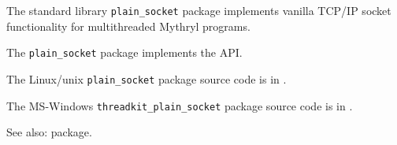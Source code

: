 
The standard library {\tt plain\_socket} package implements vanilla {\sc TCP/IP} socket functionality for multithreaded Mythryl programs.

The {\tt plain\_socket} package implements the  API.

The Linux/unix {\tt plain\_socket} package source code is in .

The {\sc MS-Windows} {\tt threadkit\_plain\_socket} package source code is in .

See also:  package.

